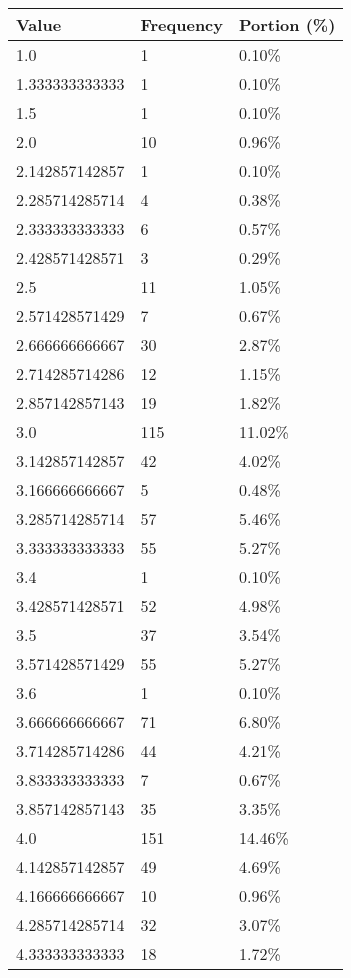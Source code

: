 \begin{table}[H]
\centering
\begin{tabular}{|l|l|l|}
\hline
\textbf{Value} & \textbf{Frequency} & \textbf{Portion (\%)} \\ \hline
1.0 & 1 & 0.10\% \\ \hline
1.333333333333 & 1 & 0.10\% \\ \hline
1.5 & 1 & 0.10\% \\ \hline
2.0 & 10 & 0.96\% \\ \hline
2.142857142857 & 1 & 0.10\% \\ \hline
2.285714285714 & 4 & 0.38\% \\ \hline
2.333333333333 & 6 & 0.57\% \\ \hline
2.428571428571 & 3 & 0.29\% \\ \hline
2.5 & 11 & 1.05\% \\ \hline
2.571428571429 & 7 & 0.67\% \\ \hline
2.666666666667 & 30 & 2.87\% \\ \hline
2.714285714286 & 12 & 1.15\% \\ \hline
2.857142857143 & 19 & 1.82\% \\ \hline
3.0 & 115 & 11.02\% \\ \hline
3.142857142857 & 42 & 4.02\% \\ \hline
3.166666666667 & 5 & 0.48\% \\ \hline
3.285714285714 & 57 & 5.46\% \\ \hline
3.333333333333 & 55 & 5.27\% \\ \hline
3.4 & 1 & 0.10\% \\ \hline
3.428571428571 & 52 & 4.98\% \\ \hline
3.5 & 37 & 3.54\% \\ \hline
3.571428571429 & 55 & 5.27\% \\ \hline
3.6 & 1 & 0.10\% \\ \hline
3.666666666667 & 71 & 6.80\% \\ \hline
3.714285714286 & 44 & 4.21\% \\ \hline
3.833333333333 & 7 & 0.67\% \\ \hline
3.857142857143 & 35 & 3.35\% \\ \hline
4.0 & 151 & 14.46\% \\ \hline
4.142857142857 & 49 & 4.69\% \\ \hline
4.166666666667 & 10 & 0.96\% \\ \hline
4.285714285714 & 32 & 3.07\% \\ \hline
4.333333333333 & 18 & 1.72\% \\ \hline

\end{tabular}
\end{table}
